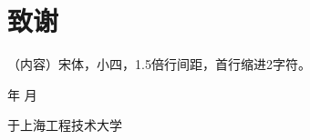 \chapter{致谢}
（内容）宋体，小四，1.5倍行间距，首行缩进2字符。

\begin{flushright}
    \number\year    年 \number\month  月
    
    于上海工程技术大学
\end{flushright}

